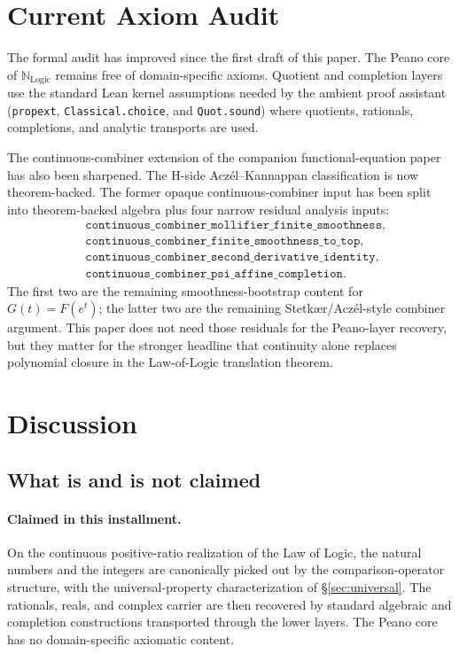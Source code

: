 \documentclass[11pt,a4paper]{article}
\theoremstyle{definition}
\theoremstyle{remark}
\begin{document}
\section{Current Axiom Audit}
\label{sec:audit}

The formal audit has improved since the first draft of this paper.
The Peano core of $\mathbb{N}_{\mathrm{Logic}}$ remains free of
domain-specific axioms. Quotient and completion layers use the standard
Lean kernel assumptions needed by the ambient proof assistant
(\texttt{propext}, \texttt{Classical.choice}, and \texttt{Quot.sound})
where quotients, rationals, completions, and analytic transports are
used.

The continuous-combiner extension of the companion functional-equation
paper has also been sharpened. The H-side Aczél--Kannappan classification
is now theorem-backed. The former opaque continuous-combiner input has
been split into theorem-backed algebra plus four narrow residual analysis
inputs:
\[
\begin{aligned}
&\texttt{continuous\_combiner\_mollifier\_finite\_smoothness},\\
&\texttt{continuous\_combiner\_finite\_smoothness\_to\_top},\\
&\texttt{continuous\_combiner\_second\_derivative\_identity},\\
&\texttt{continuous\_combiner\_psi\_affine\_completion}.
\end{aligned}
\]
The first two are the remaining smoothness-bootstrap content for
$G(t)=F(e^t)$; the latter two are the remaining Stetkær/Aczél-style
combiner argument. This paper does not need those residuals for the
Peano-layer recovery, but they matter for the stronger headline that
continuity alone replaces polynomial closure in the Law-of-Logic
translation theorem.

\section{Discussion}

\subsection{What is and is not claimed}

\paragraph{Claimed in this installment.} On the continuous positive-ratio
realization of the Law of Logic, the natural numbers and the integers
are canonically picked out by the comparison-operator structure, with
the universal-property characterization of \S\ref{sec:universal}. The
rationals, reals, and complex carrier are then recovered by standard
algebraic and completion constructions transported through the lower
layers. The Peano core has no domain-specific axiomatic content.
\end{document}
